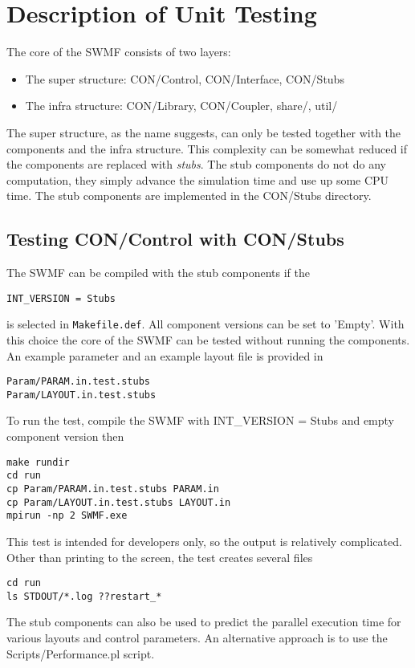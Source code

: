 \documentclass[twoside,10pt]{article}
\begin{document}
\section{Description of Unit Testing}

The core of the SWMF consists of two layers:
\begin{itemize}
\item The super structure:  CON/Control, CON/Interface, CON/Stubs
\item The infra structure: CON/Library, CON/Coupler, share/, util/
\end{itemize}
The super structure, as the name suggests, can only be tested
together with the components and the infra structure. 
This complexity can be somewhat reduced if the components are replaced
with {\it stubs}. The stub components do not do any computation,
they simply advance the simulation time and use up some CPU time.
The stub components are implemented in the CON/Stubs directory.

\subsection{Testing CON/Control with CON/Stubs}

The SWMF can be compiled with the stub components if the 
\begin{verbatim}
INT_VERSION = Stubs
\end{verbatim}
is selected in {\tt Makefile.def}. All component versions
can be set to 'Empty'. With this choice the core
of the SWMF can be tested without running the components.
An example parameter and an example layout file is provided in
\begin{verbatim}
Param/PARAM.in.test.stubs
Param/LAYOUT.in.test.stubs
\end{verbatim}
To run the test, compile the SWMF with INT\_VERSION = Stubs
and empty component version then
\begin{verbatim}
make rundir
cd run
cp Param/PARAM.in.test.stubs PARAM.in
cp Param/LAYOUT.in.test.stubs LAYOUT.in
mpirun -np 2 SWMF.exe
\end{verbatim}
This test is intended for developers only, so the output is
relatively complicated. Other than printing to the screen,
the test creates several files
\begin{verbatim}
cd run
ls STDOUT/*.log ??restart_*
\end{verbatim}
The stub components can also be used to predict the parallel 
execution time for various layouts and control parameters.
An alternative approach is to use the Scripts/Performance.pl script.
\end{document}
